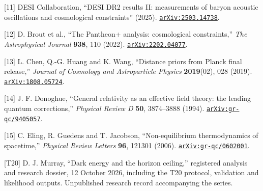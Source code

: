 \documentclass[
  11pt,
  a4paper,
]{article}
\begin{document}
{[}11{]} DESI Collaboration, ``DESI DR2 results II: measurements of baryon acoustic oscillations and cosmological constraints'' (2025). \href{https://arxiv.org/abs/2503.14738}{\nolinkurl{arXiv:2503.14738}}.

{[}12{]} D. Brout et al., ``The Pantheon+ analysis: cosmological constraints,'' \emph{The Astrophysical Journal} \textbf{938}, 110 (2022). \href{https://arxiv.org/abs/2202.04077}{\nolinkurl{arXiv:2202.04077}}.

{[}13{]} L. Chen, Q.-G. Huang and K. Wang, ``Distance priors from Planck final release,'' \emph{Journal of Cosmology and Astroparticle Physics} \textbf{2019}(02), 028 (2019). \href{https://arxiv.org/abs/1808.05724}{\nolinkurl{arXiv:1808.05724}}.

{[}14{]} J. F. Donoghue, ``General relativity as an effective field theory: the leading quantum corrections,'' \emph{Physical Review D} \textbf{50}, 3874--3888 (1994). \href{https://arxiv.org/abs/gr-qc/9405057}{\nolinkurl{arXiv:gr-qc/9405057}}.

{[}15{]} C. Eling, R. Guedens and T. Jacobson, ``Non-equilibrium thermodynamics of spacetime,'' \emph{Physical Review Letters} \textbf{96}, 121301 (2006). \href{https://arxiv.org/abs/gr-qc/0602001}{\nolinkurl{arXiv:gr-qc/0602001}}.

{[}T20{]} D. J. Murray, ``Dark energy and the horizon ceiling,'' registered analysis and research dossier, 12 October 2026, including the T20 protocol, validation and likelihood outputs. Unpublished research record accompanying the series.
\end{document}
